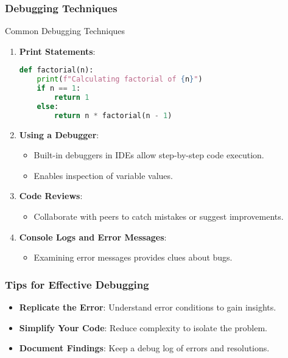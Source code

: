 \documentclass[aspectratio=169]{beamer}
\begin{document}
\begin{frame}[fragile]
  \frametitle{Debugging Techniques}
  \begin{block}{Common Debugging Techniques}
    \begin{enumerate}
      \item \textbf{Print Statements}:
        \begin{lstlisting}[language=python]
def factorial(n):
    print(f"Calculating factorial of {n}")
    if n == 1:
        return 1
    else:
        return n * factorial(n - 1)
        \end{lstlisting}
      
      \item \textbf{Using a Debugger}:
        \begin{itemize}
          \item Built-in debuggers in IDEs allow step-by-step code execution.
          \item Enables inspection of variable values.
        \end{itemize}
        
      \item \textbf{Code Reviews}:
        \begin{itemize}
          \item Collaborate with peers to catch mistakes or suggest improvements.
        \end{itemize}
        
      \item \textbf{Console Logs and Error Messages}:
        \begin{itemize}
          \item Examining error messages provides clues about bugs.
        \end{itemize}
    \end{enumerate}
  \end{block}
\end{frame}

\begin{frame}[fragile]
  \frametitle{Tips for Effective Debugging}
  \begin{itemize}
    \item \textbf{Replicate the Error}: Understand error conditions to gain insights.
    \item \textbf{Simplify Your Code}: Reduce complexity to isolate the problem.
    \item \textbf{Document Findings}: Keep a debug log of errors and resolutions.
  \end{itemize}
\end{frame}
\end{document}
